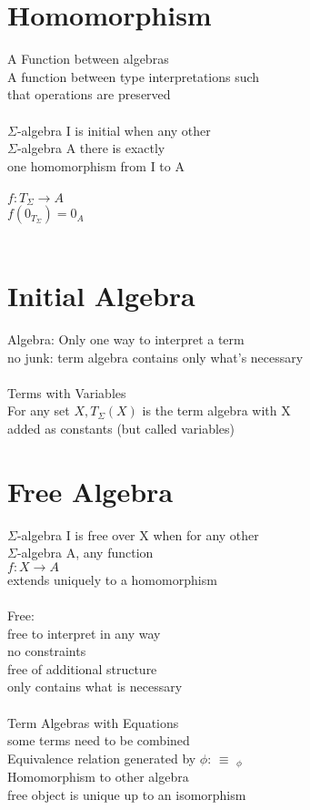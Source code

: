 \documentclass{article}
\begin{document}
\section{Homomorphism}
A Function between algebras
\\
A function between type interpretations such 
\\
that operations are preserved
\\
\\
$\Sigma$-algebra I is initial when any other 
\\
$\Sigma$-algebra A there is exactly
\\
one homomorphism from I to A
\\
\\
$f : T_{\Sigma} \rightarrow A$
\\
$f(0_{T_{\Sigma}}) = 0_{A}$
\\
\\
\section{Initial Algebra}
Algebra: Only one way to interpret a term
\\
no junk: term algebra contains only what's necessary
\\
\\
Terms with Variables 
\\
For any set $X, T_{\Sigma}(X)$ is the term algebra with X
\\
added as constants (but called variables)
\\
\section{Free Algebra}
$\Sigma$-algebra I is free over X when for any other
\\
$\Sigma$-algebra A, any function
\\
$f : X \rightarrow A$
\\
extends uniquely to a homomorphism
\\
\\
Free:
\\
free to interpret in any way
\\
no constraints
\\
free of additional structure
\\
only contains what is necessary
\\
\\
Term Algebras with Equations
\\
some terms need to be combined
\\
Equivalence relation generated by $\phi$: $\equiv$ $_{\phi}$
\\
Homomorphism to other algebra
\\
free object is unique up to an isomorphism
\\
\end{document}
